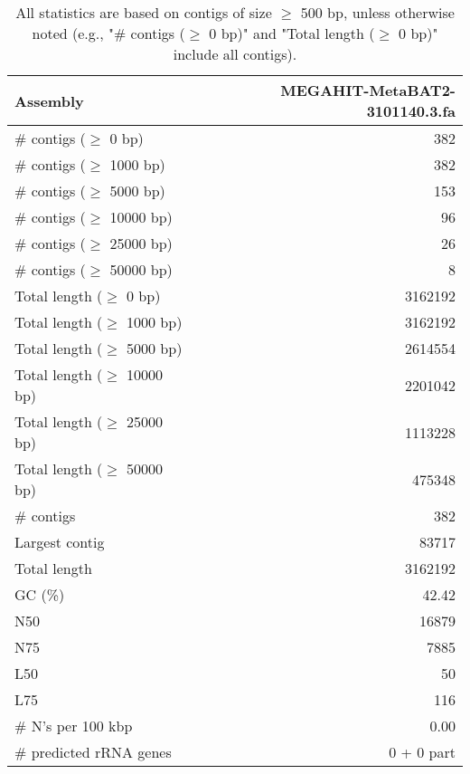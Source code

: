 \documentclass[12pt,a4paper]{article}
\begin{document}
\begin{table}[ht]
\begin{center}
\caption{All statistics are based on contigs of size $\geq$ 500 bp, unless otherwise noted (e.g., "\# contigs ($\geq$ 0 bp)" and "Total length ($\geq$ 0 bp)" include all contigs).}
\begin{tabular}{|l*{1}{|r}|}
\hline
Assembly & MEGAHIT-MetaBAT2-3101140.3.fa \\ \hline
\# contigs ($\geq$ 0 bp) & 382 \\ \hline
\# contigs ($\geq$ 1000 bp) & 382 \\ \hline
\# contigs ($\geq$ 5000 bp) & 153 \\ \hline
\# contigs ($\geq$ 10000 bp) & 96 \\ \hline
\# contigs ($\geq$ 25000 bp) & 26 \\ \hline
\# contigs ($\geq$ 50000 bp) & 8 \\ \hline
Total length ($\geq$ 0 bp) & 3162192 \\ \hline
Total length ($\geq$ 1000 bp) & 3162192 \\ \hline
Total length ($\geq$ 5000 bp) & 2614554 \\ \hline
Total length ($\geq$ 10000 bp) & 2201042 \\ \hline
Total length ($\geq$ 25000 bp) & 1113228 \\ \hline
Total length ($\geq$ 50000 bp) & 475348 \\ \hline
\# contigs & 382 \\ \hline
Largest contig & 83717 \\ \hline
Total length & 3162192 \\ \hline
GC (\%) & 42.42 \\ \hline
N50 & 16879 \\ \hline
N75 & 7885 \\ \hline
L50 & 50 \\ \hline
L75 & 116 \\ \hline
\# N's per 100 kbp & 0.00 \\ \hline
\# predicted rRNA genes & 0 + 0 part \\ \hline
\end{tabular}
\end{center}
\end{table}
\end{document}
